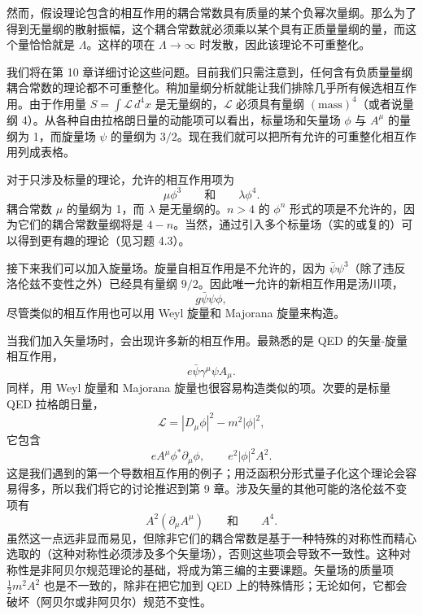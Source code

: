 然而，假设理论包含的相互作用的耦合常数具有质量的某个负幂次量纲。那么为了得到无量纲的散射振幅，这个耦合常数就必须乘以某个具有正质量量纲的量，而这个量恰恰就是 $\Lambda$。这样的项在 $\Lambda\to\infty$ 时发散，因此该理论不可重整化。

我们将在第 10 章详细讨论这些问题。目前我们只需注意到，任何含有负质量量纲耦合常数的理论都不可重整化。稍加量纲分析就能让我们排除几乎所有候选相互作用。由于作用量 $S = \int\mathcal{L}\,d^4x$ 是无量纲的，$\mathcal{L}$ 必须具有量纲 $(\mathrm{mass})^4$（或者说量纲 4）。从各种自由拉格朗日量的动能项可以看出，标量场和矢量场 $\phi$ 与 $A^\mu$ 的量纲为 1，而旋量场 $\psi$ 的量纲为 $3/2$。现在我们就可以把所有允许的可重整化相互作用列成表格。

对于只涉及标量的理论，允许的相互作用项为
\begin{equation}
  \mu\phi^3 \qquad\text{和}\qquad \lambda\phi^4 .
\end{equation}
耦合常数 $\mu$ 的量纲为 1，而 $\lambda$ 是无量纲的。$n>4$ 的 $\phi^n$ 形式的项是不允许的，因为它们的耦合常数量纲将是 $4-n$。当然，通过引入多个标量场（实的或复的）可以得到更有趣的理论（见习题 4.3）。

接下来我们可以加入旋量场。旋量自相互作用是不允许的，因为 $\bar{\psi}\psi^3$（除了违反洛伦兹不变性之外）已经具有量纲 $9/2$。因此唯一允许的新相互作用是汤川项，
\begin{equation}
  g\bar{\psi}\psi\phi,
\end{equation}
尽管类似的相互作用也可以用 Weyl 旋量和 Majorana 旋量来构造。

当我们加入矢量场时，会出现许多新的相互作用。最熟悉的是 QED 的矢量-旋量相互作用，
\begin{equation}
  e\bar{\psi}\gamma^\mu\psi A_\mu .
\end{equation}
同样，用 Weyl 旋量和 Majorana 旋量也很容易构造类似的项。次要的是标量 QED 拉格朗日量，
\begin{equation}
  \mathcal{L} = |D_\mu\phi|^2 - m^2|\phi|^2,
\end{equation}
它包含
\begin{equation}
  eA^\mu\phi^{*}\partial_\mu\phi,\qquad e^2|\phi|^2A^2 .
\end{equation}
这是我们遇到的第一个导数相互作用的例子；用泛函积分形式量子化这个理论会容易得多，所以我们将它的讨论推迟到第 9 章。涉及矢量的其他可能的洛伦兹不变项有
\begin{equation}
  A^2(\partial_\mu A^\mu) \qquad\text{和}\qquad A^4 .
\end{equation}
虽然这一点远非显而易见，但除非它们的耦合常数是基于一种特殊的对称性而精心选取的（这种对称性必须涉及多个矢量场），否则这些项会导致不一致性。这种对称性是非阿贝尔规范理论的基础，将成为第三编的主要课题。矢量场的质量项 $\tfrac{1}{2}m^2A^2$ 也是不一致的，除非在把它加到 QED 上的特殊情形；无论如何，它都会破坏（阿贝尔或非阿贝尔）规范不变性。

